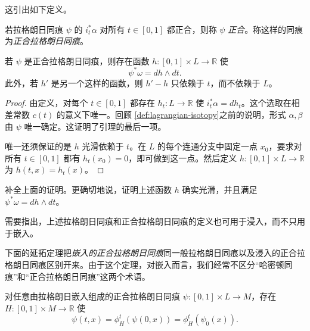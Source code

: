 这引出如下定义。

\begin{definition}\label{def:exact-lagrangian-isotopy}
若拉格朗日同痕 $\psi$ 的 $i_t^*\alpha$ 对所有 $t\in[0,1]$ 都正合，则称 $\psi$ \emph{正合}。称这样的同痕为\emph{正合拉格朗日同痕}。
\end{definition}

\begin{lemma}\label{lem:exact-isotopy-primitive}
若 $\psi$ 是正合拉格朗日同痕，则存在函数
$h:[0,1]\times L\to\mathbb R$ 使
\[
 \psi^*\omega=dh\wedge dt.
\]
此外，若 $h'$ 是另一个这样的函数，则 $h'-h$ 只依赖于 $t$，而不依赖于 $L$。
\end{lemma}

\begin{proof}
由定义，对每个 $t\in[0,1]$ 都存在 $h_t:L\to\mathbb R$ 使
$i_t^*\alpha=dh_t$。这个选取在相差常数 $c(t)$ 的意义下唯一。回顾
\cref{def:lagrangian-isotopy}之前的说明，形式 $\alpha,\beta$ 由 $\psi$ 唯一确定。这证明了引理的最后一项。

唯一还须保证的是 $h$ 光滑依赖于 $t$。在 $L$ 的每个连通分支中固定一点
$x_0$，要求对所有 $t\in[0,1]$ 都有 $h_t(x_0)=0$，即可做到这一点。然后定义
$h:[0,1]\times L\to\mathbb R$ 为 $h(t,x)=h_t(x)$。
\end{proof}

\begin{exercise}\label{ex:smooth-primitive-exact-isotopy}
补全上面的证明。更确切地说，证明上述函数 $h$ 确实光滑，并且满足
$\psi^*\omega=dh\wedge dt$。
\end{exercise}

\begin{remark}\label{rem:exact-isotopy-immersions}
需要指出，上述拉格朗日同痕和正合拉格朗日同痕的定义也可用于浸入，而不只用于嵌入。
\end{remark}

下面的延拓定理把\emph{嵌入的正合拉格朗日同痕}同一般拉格朗日同痕以及浸入的正合拉格朗日同痕区别开来。由于这个定理，对嵌入而言，我们经常不区分“哈密顿同痕”和“正合拉格朗日同痕”这两个术语。

\begin{theorem}\label{thm:exact-lagrangian-isotopy-extension}
对任意由拉格朗日嵌入组成的正合拉格朗日同痕
$\psi:[0,1]\times L\to M$，存在 $H:[0,1]\times M\to\mathbb R$ 使
\begin{equation}
 \psi(t,x)=\phi_H^t(\psi(0,x))=\phi_H^t(\psi_0(x)).
 \label{eq:exact-isotopy-ambient-hamiltonian}
\end{equation}
\end{theorem}

